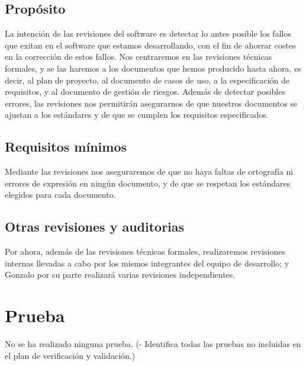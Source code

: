\documentclass[spanish,a4paper,11pt, twoside]{report}	%
\begin{document}
	\section{Propósito}
	La intención de las revisiones del software es detectar lo antes posible los fallos que exitan en el software que estamos desarrollando, con el fin de ahorrar costes en la corrección de estos fallos. Nos centraremos en las revisiones técnicas formales,
	y se las haremos a los documentos que hemos producido hasta ahora, es decir, al plan de proyecto, al documento de casos de uso, a la especificación de requisitos, y al documento de gestión de riesgos. Además de detectar posibles errores,
 	las revisiones nos permitirán asegurarnos de que nuestros documentos se ajustan a los estándares y de que se cumplen los requisitos especificados.

	\section{Requisitos mínimos}
	Mediante las revisiones nos aseguraremos de que no haya faltas de ortografía ni errores de expresión en ningún documento, y de que se respetan los estándares elegidos para cada documento.
	\section{Otras revisiones y auditorias}
	Por ahora, además de las revisiones técnicas formales, realizaremos revisiones internas llevadas a cabo por los mismos integrantes del  equipo de desarrollo;  y Gonzalo por su parte realizará varias revisiones independientes.

\newpage
\mbox{}
\thispagestyle{empty}						%
\newpage  

\chapter{ Prueba}%
	No se ha realizado ninguna prueba.
	(- Identifica todas las pruebas no incluidas en el plan
	de verificación y validación.)

\newpage
\mbox{}
\thispagestyle{empty}						%
\newpage
\end{document}
